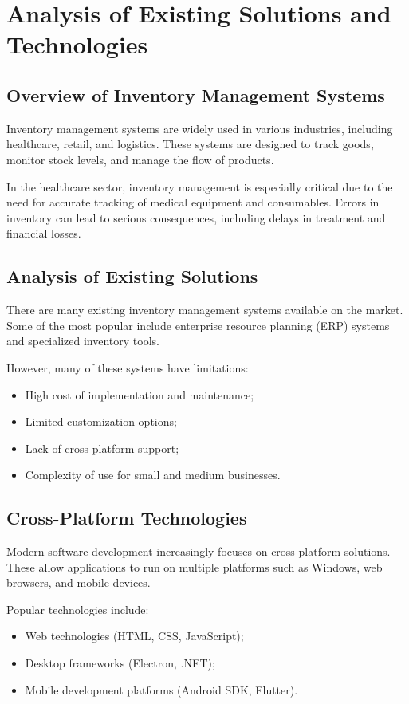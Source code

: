 \chapter{Analysis of Existing Solutions and Technologies}

\section{Overview of Inventory Management Systems}

Inventory management systems are widely used in various industries, including healthcare, retail, and logistics. These systems are designed to track goods, monitor stock levels, and manage the flow of products.

In the healthcare sector, inventory management is especially critical due to the need for accurate tracking of medical equipment and consumables. Errors in inventory can lead to serious consequences, including delays in treatment and financial losses.

\section{Analysis of Existing Solutions}

There are many existing inventory management systems available on the market. Some of the most popular include enterprise resource planning (ERP) systems and specialized inventory tools.

However, many of these systems have limitations:
\begin{itemize}
    \item High cost of implementation and maintenance;
    \item Limited customization options;
    \item Lack of cross-platform support;
    \item Complexity of use for small and medium businesses.
\end{itemize}

\section{Cross-Platform Technologies}

Modern software development increasingly focuses on cross-platform solutions. These allow applications to run on multiple platforms such as Windows, web browsers, and mobile devices.

Popular technologies include:
\begin{itemize}
    \item Web technologies (HTML, CSS, JavaScript);
    \item Desktop frameworks (Electron, .NET);
    \item Mobile development platforms (Android SDK, Flutter).
\end{itemize}

